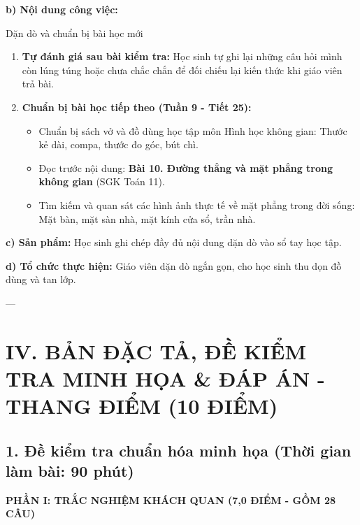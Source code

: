 \documentclass[12pt, a4paper]{article}
\begin{document}
\noindent \textbf{b) Nội dung công việc:}
\begin{pedabox}{Dặn dò và chuẩn bị bài học mới}
\begin{enumerate}[leftmargin=0.6cm]
    \item \textbf{Tự đánh giá sau bài kiểm tra:} Học sinh tự ghi lại những câu hỏi mình còn lúng túng hoặc chưa chắc chắn để đối chiếu lại kiến thức khi giáo viên trả bài.
    \item \textbf{Chuẩn bị bài học tiếp theo (Tuần 9 - Tiết 25):}
    \begin{itemize}
        \item Chuẩn bị sách vở và đồ dùng học tập môn Hình học không gian: Thước kẻ dài, compa, thước đo góc, bút chì.
        \item Đọc trước nội dung: \textbf{Bài 10. Đường thẳng và mặt phẳng trong không gian} (SGK Toán 11).
        \item Tìm kiếm và quan sát các hình ảnh thực tế về mặt phẳng trong đời sống: Mặt bàn, mặt sàn nhà, mặt kính cửa sổ, trần nhà.
    \end{itemize}
\end{enumerate}
\end{pedabox}

\noindent \textbf{c) Sản phẩm:}
Học sinh ghi chép đầy đủ nội dung dặn dò vào sổ tay học tập.

\noindent \textbf{d) Tổ chức thực hiện:}
Giáo viên dặn dò ngắn gọn, cho học sinh thu dọn đồ dùng và tan lớp.

---

\section*{IV. BẢN ĐẶC TẢ, ĐỀ KIỂM TRA MINH HỌA \& ĐÁP ÁN - THANG ĐIỂM (10 ĐIỂM)}

\subsection*{1. Đề kiểm tra chuẩn hóa minh họa (Thời gian làm bài: 90 phút)}

\noindent \textbf{PHẦN I: TRẮC NGHIỆM KHÁCH QUAN (7,0 ĐIỂM - GỒM 28 CÂU)}
\end{document}
